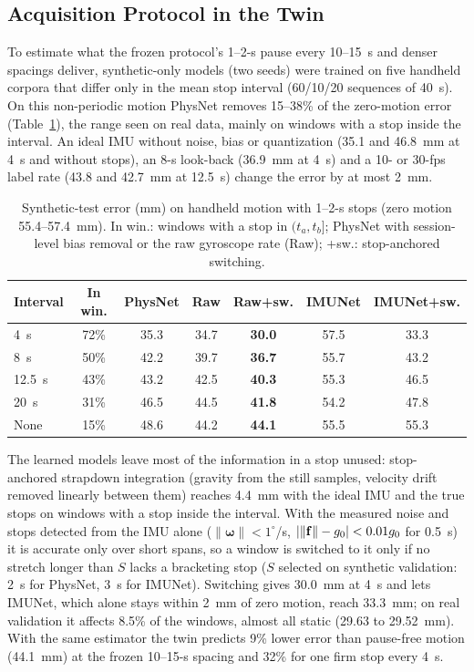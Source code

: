 \subsection{Acquisition Protocol in the Twin}
\label{sec:protocol}
To estimate what the frozen protocol's 1--2-s pause every 10--15~s and denser
spacings deliver, synthetic-only models (two seeds) were trained on five
handheld corpora that differ only in the mean stop interval (60/10/20
sequences of 40~s). On this non-periodic
motion PhysNet removes 15--38\% of the zero-motion error
(Table~\ref{tab:protocol}), the range seen on real data, mainly on windows with
a stop inside the interval. An ideal IMU without noise, bias or quantization
(35.1 and 46.8~mm at 4~s and without stops), an 8-s look-back (36.9~mm at
4~s) and a 10- or 30-fps label rate (43.8 and 42.7~mm at 12.5~s) change the
error by at most 2~mm.

\begin{table}[tb]
\centering
\caption{Synthetic-test error (mm) on handheld motion with 1--2-s stops (zero
motion 55.4--57.4~mm). In win.: windows with a stop in $(t_a,t_b]$; PhysNet
with session-level bias removal or the raw gyroscope rate (Raw); +sw.:
stop-anchored switching.}
\label{tab:protocol}
\footnotesize
\setlength{\tabcolsep}{3.2pt}
\begin{tabular}{@{}lcccccc@{}}
\toprule
Interval & In win. & PhysNet & Raw & Raw+sw. & IMUNet & IMUNet+sw. \\
\midrule
4~s    & 72\% & 35.3 & 34.7 & \textbf{30.0} & 57.5 & 33.3 \\
8~s    & 50\% & 42.2 & 39.7 & \textbf{36.7} & 55.7 & 43.2 \\
12.5~s & 43\% & 43.2 & 42.5 & \textbf{40.3} & 55.3 & 46.5 \\
20~s   & 31\% & 46.5 & 44.5 & \textbf{41.8} & 54.2 & 47.8 \\
None   & 15\% & 48.6 & 44.2 & \textbf{44.1} & 55.5 & 55.3 \\
\bottomrule
\end{tabular}
\end{table}

The learned models leave most of the information in a stop unused:
stop-anchored strapdown integration (gravity from the still samples, velocity
drift removed linearly between them) reaches 4.4~mm with the ideal IMU and the
true stops on windows with a stop inside the interval. With the measured noise
and stops detected from the IMU alone ($\|\boldsymbol\omega\|<1^\circ$/s,
$|\|{\bf f}\|-g_0|<0.01g_0$ for 0.5~s) it is accurate only over short spans,
so a window is switched to it only if no stretch longer than $S$ lacks a
bracketing stop ($S$ selected on synthetic validation: 2~s for PhysNet, 3~s for
IMUNet). Switching gives 30.0~mm at 4~s and lets IMUNet, which alone stays
within 2~mm of zero motion, reach 33.3~mm; on real validation it affects 8.5\%
of the windows, almost all static (29.63 to 29.52~mm). With the same estimator
the twin predicts 9\% lower error than pause-free motion (44.1~mm) at the
frozen 10--15-s spacing and 32\% for one firm stop every 4~s.

